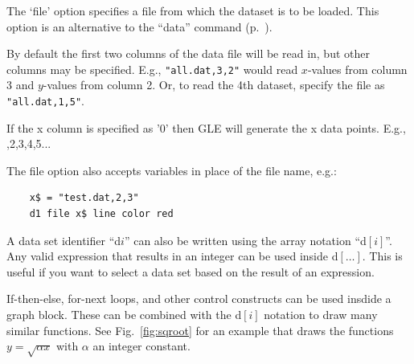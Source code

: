 \begin{commanddescription}
\item[{\sf dn file ``all.dat,xc,yc'' [marker {\sf mname}] [line]}   ]

The `file' option specifies a file from which the dataset is to be loaded. This option is an alternative to the ``data'' command (p.~\pageref{cmd:data}).

By default the first two columns of the data file will be read in, but other columns may be specified.
E.g., \verb+"all.dat,3,2"+ would read $x$-values from column 3 and $y$-values from column 2. Or, to read the 4th dataset, specify the file as \verb+"all.dat,1,5"+.

If the x column is specified as {\sf '0'} then GLE will generate the x data points. E.g., {,2,3,4,5...}

The file option also accepts variables in place of the file name, e.g.:

\begin{Verbatim}
	x$ = "test.dat,2,3"
	d1 file x$ line color red
\end{Verbatim}

%
%

\item[{\sf d$\left[i\right]$ $\ldots$}]

A data set identifier ``d$i$'' can also be written using the array notation ``d$\left[i\right]$''. Any valid expression that results in an integer can be used inside d$\left[\ldots\right]$. This is useful if you want to select a data set based on the result of an expression.

If-then-else, for-next loops, and other control constructs can be used insdide a graph block. These can be combined with the d$\left[i\right]$ notation to draw many similar functions. See Fig.~\ref{fig:sqroot} for an example that draws the functions $y = \sqrt{\alpha x}$ with $\alpha$ an integer constant.


\end{commanddescription}
